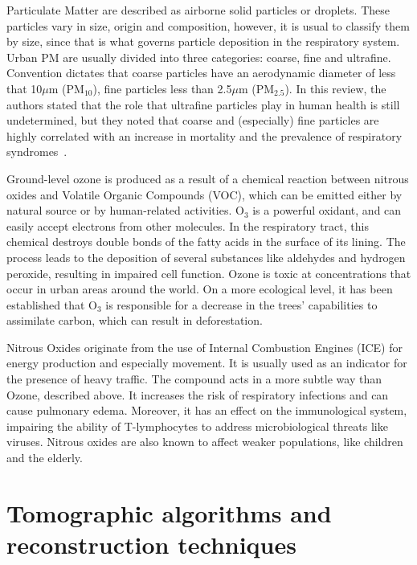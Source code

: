 Particulate Matter are described as airborne solid particles or
droplets. These particles vary in size, origin and composition, however,
it is usual to classify them by size, since that is what governs
particle deposition in the respiratory system. Urban \gls{PM} are
usually divided into three categories: coarse, fine and ultrafine.
Convention dictates that coarse particles have an aerodynamic diameter
of less that 10$\mu$m (PM$_{10}$), fine particles less than 2.5$\mu$m
(PM$_{2.5}$). In this review, the authors stated that the role that
ultrafine particles play in human health is still undetermined, but they
noted that coarse and (especially) fine particles are highly correlated
with an increase in mortality and the prevalence of respiratory
syndromes~\cite{WorldHealthOrganisationEurope2004}. 

Ground-level ozone is produced as a result of a chemical reaction
between nitrous oxides and Volatile Organic Compounds (\gls{VOC}), which
can be emitted either by natural source or by human-related activities.
O$_3$ is a powerful oxidant, and can easily accept electrons from other
molecules. In the respiratory tract, this chemical destroys double bonds
of the fatty acids in the surface of its lining. The process leads to
the deposition of several substances like aldehydes and hydrogen
peroxide, resulting in impaired cell function. Ozone is toxic at
concentrations that occur in urban areas around the world. On a more
ecological level, it has been established that O$_3$ is responsible for
a decrease in the trees' capabilities to assimilate carbon, which can
result in deforestation.

Nitrous Oxides originate from the use of Internal Combustion Engines
(\gls{ICE}) for energy production and especially movement. It is usually
used as an indicator for the presence of heavy traffic. The compound
acts in a more subtle way than Ozone, described above. It increases the
risk of respiratory infections and can cause pulmonary edema. Moreover,
it has an effect on the immunological system, impairing the ability of
T-lymphocytes to address microbiological threats like viruses. Nitrous
oxides are also known to affect weaker populations, like children and
the elderly.







\section{Tomographic algorithms and reconstruction techniques}%
\label{sec:tomographic_algorithms_and_reconstruction_techniques}

